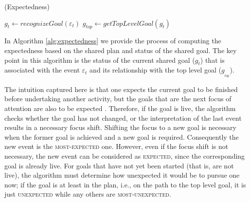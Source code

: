 \documentclass{aamas2016_extendedabstract}
\begin{document}
\vspace*{-2mm}
\begin{algorithm}
	\caption{(Expectedness)}
	\label{alg:expectedness}
	\begin{algorithmic}[1]
			\State $\mathit{g}_{t} \gets \textit{recognizeGoal}{(\varepsilon_t)}$
			\State $\mathit{g}_{top} \gets \textit{getTopLevelGoal}{(\mathit{g}_{t})}$
				\State {}
				\Else
					\State {}
				\EndIf
			\Else
					\State {}
				\Else
					\State {}
				\EndIf
			\EndIf
		\EndFunction
	\end{algorithmic}
\end{algorithm}

\vspace*{-3mm}
In Algorithm \ref{alg:expectedness} we provide the process of computing the
expectedness based on the shared plan and status of the shared goal. The key
point in this algorithm is the status of the current shared goal
($\mathit{g}_{t}$) that is associated with the event $\varepsilon_t$ and its
relationship with the top level goal ($\mathit{g}_{_{top}}$).

The intuition captured here is that one expects the current goal to be finished
before undertaking another activity, but the goals that are the next focus of
attention are also to be expected \cite{rich:focused-unfocused-users}.
Therefore, if the goal is live, the algorithm checks whether the goal has not
changed, or the interpretation of the last event results in a necessary focus
shift. Shifting the focus to a new goal is necessary when the former goal is
achieved and a new goal is required. Consequently the new event is the
\textsc{most-expected} one. However, even if the focus shift is not necessary,
the new event can be considered as \textsc{expected}, since the corresponding
goal is already live. For goals that have not yet been started (that is, are not
live), the algorithm must determine how unexpected it would be to pursue one
now; if the goal is at least in the plan, i.e., on the path to the top level
goal, it is just \textsc{unexpected} while any others are
\textsc{most-unexpected}.
\end{document}
